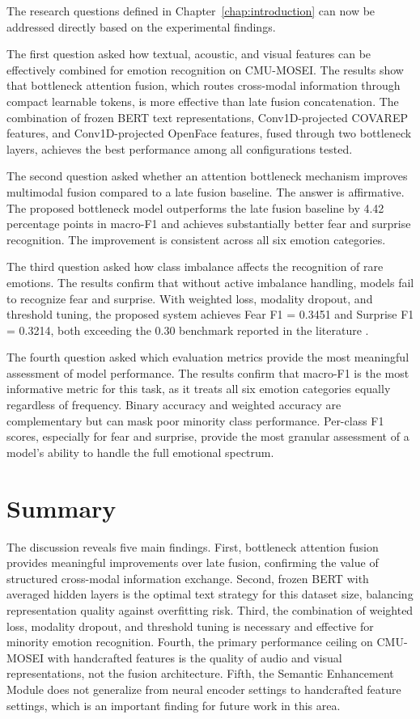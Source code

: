 The research questions defined in Chapter~\ref{chap:introduction} can now be addressed directly based on the experimental findings.

The first question asked how textual, acoustic, and visual features can be effectively combined for emotion recognition on CMU-MOSEI. The results show that bottleneck attention fusion, which routes cross-modal information through compact learnable tokens, is more effective than late fusion concatenation. The combination of frozen BERT text representations, Conv1D-projected COVAREP features, and Conv1D-projected OpenFace features, fused through two bottleneck layers, achieves the best performance among all configurations tested.

The second question asked whether an attention bottleneck mechanism improves multimodal fusion compared to a late fusion baseline. The answer is affirmative. The proposed bottleneck model outperforms the late fusion baseline by 4.42 percentage points in macro-F1 and achieves substantially better fear and surprise recognition. The improvement is consistent across all six emotion categories.

The third question asked how class imbalance affects the recognition of rare emotions. The results confirm that without active imbalance handling, models fail to recognize fear and surprise. With weighted loss, modality dropout, and threshold tuning, the proposed system achieves Fear F1 = 0.3451 and Surprise F1 = 0.3214, both exceeding the 0.30 benchmark reported in the literature \cite{nguyen2025enhanced}.

The fourth question asked which evaluation metrics provide the most meaningful assessment of model performance. The results confirm that macro-F1 is the most informative metric for this task, as it treats all six emotion categories equally regardless of frequency. Binary accuracy and weighted accuracy are complementary but can mask poor minority class performance. Per-class F1 scores, especially for fear and surprise, provide the most granular assessment of a model's ability to handle the full emotional spectrum.

\section{Summary}

The discussion reveals five main findings. First, bottleneck attention fusion provides meaningful improvements over late fusion, confirming the value of structured cross-modal information exchange. Second, frozen BERT with averaged hidden layers is the optimal text strategy for this dataset size, balancing representation quality against overfitting risk. Third, the combination of weighted loss, modality dropout, and threshold tuning is necessary and effective for minority emotion recognition. Fourth, the primary performance ceiling on CMU-MOSEI with handcrafted features is the quality of audio and visual representations, not the fusion architecture. Fifth, the Semantic Enhancement Module does not generalize from neural encoder settings to handcrafted feature settings, which is an important finding for future work in this area.